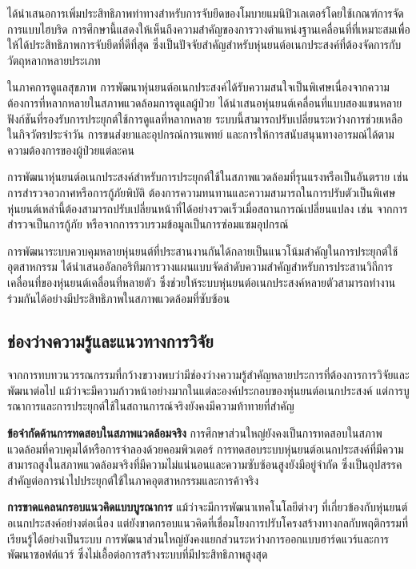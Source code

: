 \documentclass[a4paper]{article}
\begin{document}
\textcite{xie2024pose} ได้นำเสนอการเพิ่มประสิทธิภาพท่าทางสำหรับการจับยึดของโมบายแมนิปิวเลเตอร์โดยใช้เกณฑ์การจัดการแบบไฮบริด การศึกษานี้แสดงให้เห็นถึงความสำคัญของการวางตำแหน่งฐานเคลื่อนที่ที่เหมาะสมเพื่อให้ได้ประสิทธิภาพการจับยึดที่ดีที่สุด ซึ่งเป็นปัจจัยสำคัญสำหรับหุ่นยนต์อเนกประสงค์ที่ต้องจัดการกับวัตถุหลากหลายประเภท

ในภาคการดูแลสุขภาพ การพัฒนาหุ่นยนต์อเนกประสงค์ได้รับความสนใจเป็นพิเศษเนื่องจากความต้องการที่หลากหลายในสภาพแวดล้อมการดูแลผู้ป่วย \textcite{stueckler2023hollie} ได้นำเสนอหุ่นยนต์เคลื่อนที่แบบสองแขนหลายฟังก์ชันที่รองรับการประยุกต์ใช้การดูแลที่หลากหลาย ระบบนี้สามารถปรับเปลี่ยนระหว่างการช่วยเหลือในกิจวัตรประจำวัน การขนส่งยาและอุปกรณ์การแพทย์ และการให้การสนับสนุนทางอารมณ์ได้ตามความต้องการของผู้ป่วยแต่ละคน

การพัฒนาหุ่นยนต์อเนกประสงค์สำหรับการประยุกต์ใช้ในสภาพแวดล้อมที่รุนแรงหรือเป็นอันตราย เช่น การสำรวจอวกาศหรือการกู้ภัยพิบัติ ต้องการความทนทานและความสามารถในการปรับตัวเป็นพิเศษ หุ่นยนต์เหล่านี้ต้องสามารถปรับเปลี่ยนหน้าที่ได้อย่างรวดเร็วเมื่อสถานการณ์เปลี่ยนแปลง เช่น จากการสำรวจเป็นการกู้ภัย หรือจากการรวบรวมข้อมูลเป็นการซ่อมแซมอุปกรณ์

การพัฒนาระบบควบคุมหลายหุ่นยนต์ที่ประสานงานกันได้กลายเป็นแนวโน้มสำคัญในการประยุกต์ใช้อุตสาหกรรม \textcite{ieee2015prioritized} ได้นำเสนออัลกอริทึมการวางแผนแบบจัดลำดับความสำคัญสำหรับการประสานวิถีการเคลื่อนที่ของหุ่นยนต์เคลื่อนที่หลายตัว ซึ่งช่วยให้ระบบหุ่นยนต์อเนกประสงค์หลายตัวสามารถทำงานร่วมกันได้อย่างมีประสิทธิภาพในสภาพแวดล้อมที่ซับซ้อน

\subsection{ช่องว่างความรู้และแนวทางการวิจัย}

จากการทบทวนวรรณกรรมที่กว้างขวางพบว่ามีช่องว่างความรู้สำคัญหลายประการที่ต้องการการวิจัยและพัฒนาต่อไป แม้ว่าจะมีความก้าวหน้าอย่างมากในแต่ละองค์ประกอบของหุ่นยนต์อเนกประสงค์ แต่การบูรณาการและการประยุกต์ใช้ในสถานการณ์จริงยังคงมีความท้าทายที่สำคัญ

\textbf{ข้อจำกัดด้านการทดสอบในสภาพแวดล้อมจริง} การศึกษาส่วนใหญ่ยังคงเป็นการทดสอบในสภาพแวดล้อมที่ควบคุมได้หรือการจำลองด้วยคอมพิวเตอร์ การทดสอบระบบหุ่นยนต์อเนกประสงค์ที่มีความสามารถสูงในสภาพแวดล้อมจริงที่มีความไม่แน่นอนและความซับซ้อนสูงยังมีอยู่จำกัด ซึ่งเป็นอุปสรรคสำคัญต่อการนำไปประยุกต์ใช้ในภาคอุตสาหกรรมและการค้าจริง

\textbf{การขาดแคลนกรอบแนวคิดแบบบูรณาการ} แม้ว่าจะมีการพัฒนาเทคโนโลยีต่างๆ ที่เกี่ยวข้องกับหุ่นยนต์อเนกประสงค์อย่างต่อเนื่อง แต่ยังขาดกรอบแนวคิดที่เชื่อมโยงการปรับโครงสร้างทางกลกับพฤติกรรมที่เรียนรู้ได้อย่างเป็นระบบ การพัฒนาส่วนใหญ่ยังคงแยกส่วนระหว่างการออกแบบฮาร์ดแวร์และการพัฒนาซอฟต์แวร์ ซึ่งไม่เอื้อต่อการสร้างระบบที่มีประสิทธิภาพสูงสุด
\end{document}
